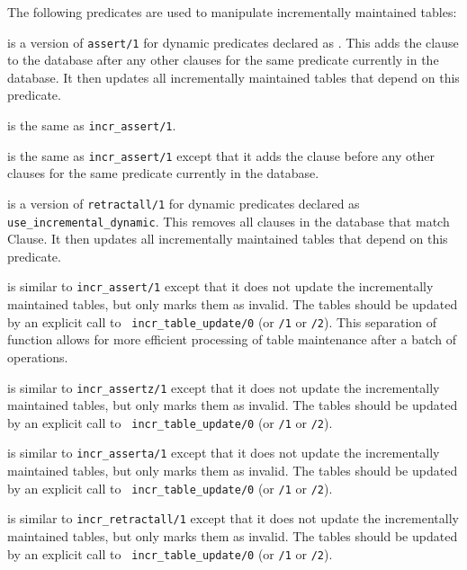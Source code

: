 The following predicates are used to manipulate incrementally
maintained tables:

\begin{description}
is a version of {\tt assert/1} for dynamic predicates declared as
.  This adds the clause to
the database after any other clauses for the same predicate currently
in the database.  It then updates all incrementally maintained tables
that depend on this predicate.

is the same as {\tt incr\_assert/1}.

is the same as {\tt incr\_assert/1} except that it adds the clause
before any other clauses for the same predicate currently in the
database.

is a version of {\tt retractall/1} for dynamic predicates declared as
{\tt use\_incremental\_dynamic}.  This removes all clauses in the database that
match Clause.  It then updates all incrementally maintained tables
that depend on this predicate.

is similar to {\tt incr\_assert/1} except that it does not update the
incrementally maintained tables, but only marks them as invalid.  The
tables should be updated by an explicit call to {\tt
incr\_table\_update/0} (or {\tt /1} or {\tt /2}).  This separation of
function allows for more efficient processing of table maintenance
after a batch of operations.

is similar to {\tt incr\_assertz/1} except that it does not update the
incrementally maintained tables, but only marks them as invalid.  The
tables should be updated by an explicit call to {\tt
incr\_table\_update/0} (or {\tt /1} or {\tt /2}).

is similar to {\tt incr\_asserta/1} except that it does not update the
incrementally maintained tables, but only marks them as invalid.  The
tables should be updated by an explicit call to {\tt
incr\_table\_update/0} (or {\tt /1} or {\tt /2}).

is similar to {\tt incr\_retractall/1} except that it does not update
the incrementally maintained tables, but only marks them as invalid.
The tables should be updated by an explicit call to {\tt
incr\_table\_update/0} (or {\tt /1} or {\tt /2}).


\end{description}
